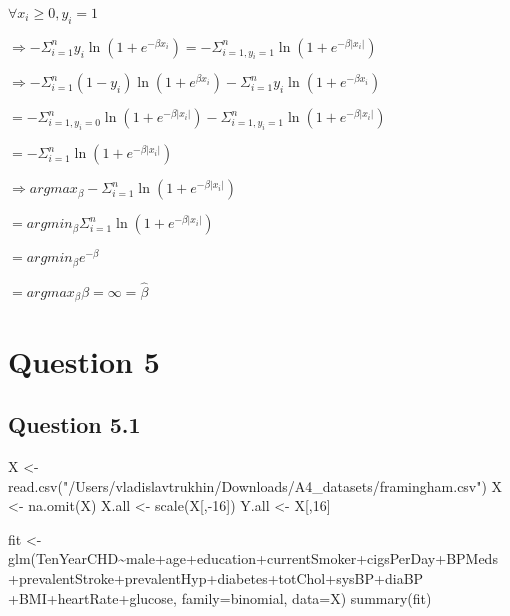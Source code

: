 \documentclass[
]{article}
\newenvironment{Shaded}{\begin{snugshade}}{\end{snugshade}}
\newcommand{\AttributeTok}[1]{\textcolor[rgb]{0.77,0.63,0.00}{#1}}
\newcommand{\DecValTok}[1]{\textcolor[rgb]{0.00,0.00,0.81}{#1}}
\newcommand{\FunctionTok}[1]{\textcolor[rgb]{0.00,0.00,0.00}{#1}}
\newcommand{\NormalTok}[1]{#1}
\newcommand{\OtherTok}[1]{\textcolor[rgb]{0.56,0.35,0.01}{#1}}
\newcommand{\SpecialCharTok}[1]{\textcolor[rgb]{0.00,0.00,0.00}{#1}}
\newcommand{\StringTok}[1]{\textcolor[rgb]{0.31,0.60,0.02}{#1}}
\begin{document}
\(\forall x_i\geq 0, y_i=1\)

\(\Rightarrow -\Sigma_{i=1}^ny_i\ln(1+e^{-\beta x_i}) = -\Sigma_{i=1, y_i=1}^n\ln(1+e^{-\beta|x_i|})\)

\(\Rightarrow -\Sigma_{i=1}^n(1-y_i)\ln(1+e^{\beta x_i})-\Sigma_{i=1}^ny_i\ln(1+e^{-\beta x_i})\)

\(=-\Sigma_{i=1, y_i=0}^n\ln(1+e^{-\beta|x_i|})-\Sigma_{i=1, y_i=1}^n\ln(1+e^{-\beta|x_i|})\)

\(=-\Sigma_{i=1}^n\ln(1+e^{-\beta|x_i|})\)

\(\Rightarrow argmax_\beta-\Sigma_{i=1}^n\ln(1+e^{-\beta|x_i|})\)

\(=argmin_\beta\Sigma_{i=1}^n\ln(1+e^{-\beta|x_i|})\)

\(=argmin_\beta e^{-\beta}\)

\(=argmax_\beta\beta = \infty = \hat\beta\)

\hypertarget{question-5}{%
\section{Question 5}\label{question-5}}

\hypertarget{question-5.1}{%
\subsection{Question 5.1}\label{question-5.1}}

\begin{Shaded}
\begin{Highlighting}[]
\NormalTok{X }\OtherTok{\textless{}{-}} \FunctionTok{read.csv}\NormalTok{(}\StringTok{"/Users/vladislavtrukhin/Downloads/A4\_datasets/framingham.csv"}\NormalTok{)}
\NormalTok{X }\OtherTok{\textless{}{-}} \FunctionTok{na.omit}\NormalTok{(X)}
\NormalTok{X.all }\OtherTok{\textless{}{-}} \FunctionTok{scale}\NormalTok{(X[,}\SpecialCharTok{{-}}\DecValTok{16}\NormalTok{])}
\NormalTok{Y.all }\OtherTok{\textless{}{-}}\NormalTok{ X[,}\DecValTok{16}\NormalTok{]}

\NormalTok{fit }\OtherTok{\textless{}{-}} \FunctionTok{glm}\NormalTok{(TenYearCHD}\SpecialCharTok{\textasciitilde{}}\NormalTok{male}\SpecialCharTok{+}\NormalTok{age}\SpecialCharTok{+}\NormalTok{education}\SpecialCharTok{+}\NormalTok{currentSmoker}\SpecialCharTok{+}\NormalTok{cigsPerDay}\SpecialCharTok{+}\NormalTok{BPMeds}
           \SpecialCharTok{+}\NormalTok{prevalentStroke}\SpecialCharTok{+}\NormalTok{prevalentHyp}\SpecialCharTok{+}\NormalTok{diabetes}\SpecialCharTok{+}\NormalTok{totChol}\SpecialCharTok{+}\NormalTok{sysBP}\SpecialCharTok{+}\NormalTok{diaBP}
           \SpecialCharTok{+}\NormalTok{BMI}\SpecialCharTok{+}\NormalTok{heartRate}\SpecialCharTok{+}\NormalTok{glucose, }\AttributeTok{family=}\NormalTok{binomial, }\AttributeTok{data=}\NormalTok{X)}
\FunctionTok{summary}\NormalTok{(fit)}
\end{Highlighting}
\end{Shaded}
\end{document}
